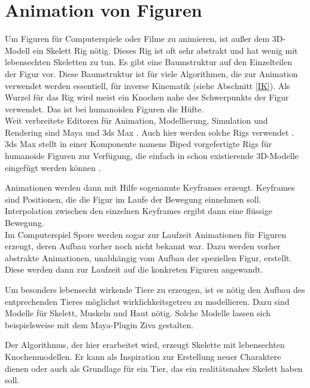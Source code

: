 

\section{Animation von Figuren}
\label{character_animation}

Um Figuren für Computerspiele oder Filme zu animieren, ist außer dem 3D-Modell ein Skelett \bzw Rig nötig. Dieses Rig ist oft sehr abstrakt und hat wenig mit lebensechten Skeletten zu tun. Es gibt eine Baumstruktur auf den Einzelteilen der Figur vor. Diese Baumstruktur ist für viele Algorithmen, die zur Animation verwendet werden essentiell, \zb für inverse Kinematik (siehe Abschnitt \ref{IK}). Als Wurzel für das Rig wird meist ein Knochen nahe des Schwerpunkts der Figur verwendet. Das ist bei humanoiden Figuren die Hüfte.\\
Weit verbreitete Editoren für Animation, Modellierung, Simulation und Rendering sind Maya \cite{Maya} und 3ds Max \cite{3dsMax}. Auch hier werden solche Rigs verwendet \cite{MayaSkeletonHierarchy}. 3ds Max stellt \zb in einer Komponente namens Biped vorgefertigte Rigs für humanoide Figuren zur Verfügung, die einfach in schon existierende 3D-Modelle eingefügt werden können \cite{3dsMaxBiped}.

Animationen werden dann mit Hilfe sogenannte Keyframes erzeugt. Keyframes sind Positionen, die die Figur im Laufe der Bewegung einnehmen soll. Interpolation zwischen den einzelnen Keyframes ergibt dann eine flüssige Bewegung. \cite[Kapitel 3]{sporeanim}\\
Im Computerspiel Spore \cite{Spore} werden sogar zur Laufzeit Animationen für Figuren erzeugt, deren Aufbau vorher noch nicht bekannt war. Dazu werden vorher abstrakte Animationen, unabhängig vom Aufbau der speziellen Figur, erstellt. Diese werden dann zur Laufzeit auf die konkreten Figuren angewandt. \cite{sporeanim}

Um besonders lebensecht wirkende Tiere zu erzeugen, ist es nötig den Aufbau des entprechenden Tieres möglichst wirklichkeitsgetreu zu modellieren. Dazu sind Modelle für Skelett, Muskeln und Haut nötig. Solche Modelle lassen sich beispielsweise mit dem Maya-Plugin Ziva \cite{Ziva} gestalten. \cite{ZivaGeneralSetup}

Der Algorithmus, der hier erarbeitet wird, erzeugt Skelette mit lebensechten Knochenmodellen. Er kann als Inspiration zur Erstellung neuer Charaktere dienen oder auch als Grundlage für ein Tier, das ein realitätsnahes Skelett haben soll.


